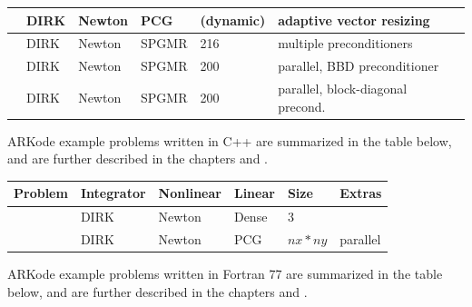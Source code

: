 \documentclass[letterpaper,10pt,english]{sphinxmanual}
\begin{document}
\begin{tabulary}{\linewidth}{|L|L|L|L|L|L|}
\hline
{\hyperref[c_serial:ark-heat1d-adapt]{\emph{}}}
 & 
DIRK
 & 
Newton
 & 
PCG
 & 
(dynamic)
 & 
adaptive vector resizing
\\
\hline
{\hyperref[c_serial:ark-krylovdemo-prec]{\emph{}}}
 & 
DIRK
 & 
Newton
 & 
SPGMR
 & 
216
 & 
multiple preconditioners
\\
\hline
{\hyperref[c_parallel:ark-diurnal-kry-bbd-p]{\emph{}}}
 & 
DIRK
 & 
Newton
 & 
SPGMR
 & 
200
 & 
parallel, BBD preconditioner
\\
\hline
{\hyperref[c_parallel:ark-diurnal-kry-p]{\emph{}}}
 & 
DIRK
 & 
Newton
 & 
SPGMR
 & 
200
 & 
parallel, block-diagonal precond.
\\
\hline\end{tabulary}


ARKode example problems written in C++ are summarized in the table
below, and are further described in the chapters {\hyperref[cpp_serial:serial-cpp]{\emph{}}} and
{\hyperref[cpp_parallel:parallel-cpp]{\emph{}}}.

\begin{tabulary}{\linewidth}{|L|L|L|L|L|L|}
\hline
\textsf{\relax 
Problem
} & \textsf{\relax 
Integrator
} & \textsf{\relax 
Nonlinear
} & \textsf{\relax 
Linear
} & \textsf{\relax 
Size
} & \textsf{\relax 
Extras
}\\
\hline
{\hyperref[cpp_serial:ark-analytic-sys]{\emph{}}}
 & 
DIRK
 & 
Newton
 & 
Dense
 & 
3
 & \\
\hline
{\hyperref[cpp_parallel:ark-heat2d]{\emph{}}}
 & 
DIRK
 & 
Newton
 & 
PCG
 & 
\(nx*ny\)
 & 
parallel
\\
\hline\end{tabulary}


ARKode example problems written in Fortran 77 are summarized in the table
below, and are further described in the chapters {\hyperref[f77_serial:serial-f77]{\emph{}}} and
{\hyperref[f77_parallel:parallel-f77]{\emph{}}}.
\end{document}
